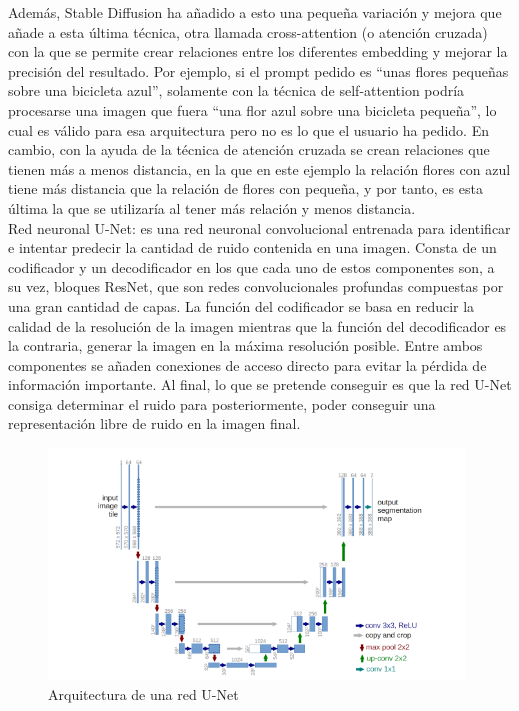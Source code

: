 Además, Stable Diffusion ha añadido a esto una pequeña variación y mejora que añade a esta última técnica, otra llamada cross-attention (o atención cruzada) con la que se permite crear relaciones entre los diferentes embedding y mejorar la precisión del resultado. Por ejemplo, si el prompt pedido es “unas flores pequeñas sobre una bicicleta azul”, solamente con la técnica de self-attention podría procesarse una imagen que fuera “una flor azul sobre una bicicleta pequeña”, lo cual es válido para esa arquitectura pero no es lo que el usuario ha pedido. En cambio, con la ayuda de la técnica de atención cruzada se crean relaciones que tienen más a menos distancia, en la que en este ejemplo la relación flores con azul tiene más distancia que la relación de flores con pequeña, y por tanto, es esta última la que se utilizaría al tener más relación y menos distancia.\\

Red neuronal U-Net: es una red neuronal convolucional entrenada para identificar e intentar predecir la cantidad de ruido contenida en una imagen. Consta de un codificador y un decodificador en los que cada uno de estos componentes son, a su vez, bloques ResNet, que son redes convolucionales profundas compuestas por una gran cantidad de capas. La función del codificador se basa en reducir la calidad de la resolución de la imagen mientras que  la función del decodificador es la contraria, generar la imagen en la máxima resolución posible. Entre ambos componentes se añaden conexiones de acceso directo para evitar la pérdida de información importante. Al final, lo que se pretende conseguir es que la red U-Net consiga determinar el ruido para posteriormente, poder conseguir una representación libre de ruido en la imagen final.
\begin{figure}[h]
	\centering
	\includegraphics[width = 0.3
	\textwidth]{Imagenes/Vectorial/u-net.png}
	\caption{Arquitectura de una red U-Net}
	\label{fig:sampleImage}
\end{figure}

